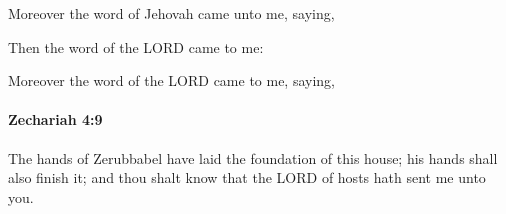 			\begin{versebox}
					\item[BHS] 
					\item[LXX] 
					\item[ASV] Moreover the word of Jehovah came unto me, saying,
					\item[NIV] Then the word of the LORD came to me:
					\item[NRSV] Moreover the word of the LORD came to me, saying,
			\end{versebox}

		\paragraph{Zechariah 4:9} %
			\label{ZECHARIAH-4-9}

			The hands of Zerubbabel have laid the foundation of this house; his hands shall also finish it; and thou shalt know that the LORD of hosts hath sent me unto you.

